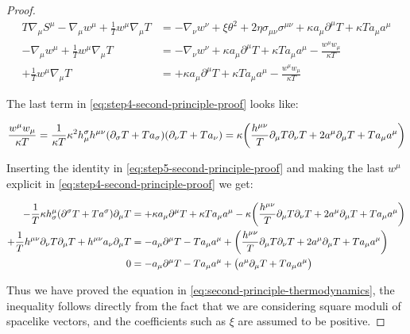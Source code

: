 \documentclass[main.tex]{subfiles}
\begin{document}
\begin{proof}
    \begin{subequations}
    \begin{align}
      T\nabla_\mu S^\mu - \nabla_\mu w^\mu + \frac{1}{T} w^\mu \nabla_\mu T &=
      - \nabla_\nu w^\nu
      + \xi \theta^2 + 2 \eta \sigma_{\mu\nu} \sigma^{\mu\nu}
      + \kappa a_\mu \partial^\mu T + \kappa T a_\mu a^\mu
      \label{eq:step-second-principle-proof-before-subtraction} \\
      - \nabla_\mu w^\mu + \frac{1}{T} w^\mu \nabla_\mu T &=
      - \nabla_\nu w^\nu
      + \kappa a_\mu \partial^\mu T + \kappa T a_\mu a^\mu
      - \frac{w^\mu w_\mu}{\kappa T} \label{eq:step-second-principle-proof-after-subtraction} \\
      + \frac{1}{T} w^\mu \nabla_\mu T &=
      + \kappa a_\mu \partial^\mu T + \kappa T a_\mu a^\mu
      - \frac{w^\mu w_\mu}{\kappa T} \label{eq:step4-second-principle-proof}
    \end{align}
    \end{subequations}

    The last term in \eqref{eq:step4-second-principle-proof} looks like:

    \begin{equation} \label{eq:step5-second-principle-proof}
        \frac{w^\mu w_\mu}{\kappa T} = \frac{1}{\kappa T }
        \kappa^2 h^\sigma _\mu h^{\mu\nu} \qty(\partial_\sigma T + T a_\sigma) \qty(\partial_\nu T + T a_\nu)
        = \kappa \qty(\frac{h^{\mu\nu}}{T} \partial_\mu T \partial_\nu T + 2 a^\mu \partial_\mu T + T a_\mu a^\mu)
    \end{equation}

    Inserting the identity in \eqref{eq:step5-second-principle-proof}  and making the last \(w^\mu\) explicit in \eqref{eq:step4-second-principle-proof} we get:

    \begin{subequations}
    \begin{align}
      -\frac{1}{T} \kappa h^\mu _\sigma  \qty(\partial^\sigma T + T a^\sigma) \partial_\mu T  &= + \kappa a_\mu \partial^\mu T + \kappa T a_\mu a^\mu
      -\kappa \qty(\frac{h^{\mu\nu}}{T} \partial_\mu T \partial_\nu T + 2 a^\mu \partial_\mu T + T a_\mu a^\mu) \\
      +\frac{1}{T} h^{\mu\nu} \partial_\nu T  \partial_\mu T + h^{\mu\nu} a_\nu \partial_\mu T  &= - a_\mu \partial^\mu T -  T a_\mu a^\mu
      + \qty(\frac{h^{\mu\nu}}{T} \partial_\mu T \partial_\nu T + 2 a^\mu \partial_\mu T + T a_\mu a^\mu) \\
      0  &= - a_\mu \partial^\mu T -  T a_\mu a^\mu
      + \qty( a^\mu \partial_\mu T + T a_\mu a^\mu)
    \end{align}
    \end{subequations}

    Thus we have proved the equation in \eqref{eq:second-principle-thermodynamics}, the inequality follows directly from the fact that we are considering square moduli of spacelike vectors, and the coefficients such as \(\xi\) are assumed to be positive.
\end{proof}
\end{document}

